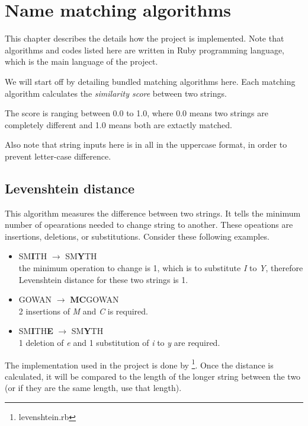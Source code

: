 \chapter{Name matching algorithms}
\label{ch:nma}

This chapter describes the details how the project is implemented.
Note that algorithms and codes listed here are written in Ruby programming language,
which is the main language of the project.

We will start off by detailing bundled matching algorithms here.
Each matching algorithm calculates the \emph{similarity score} between
two strings.

The score is ranging between 0.0 to 1.0, where 0.0 means
two strings are completely different and 1.0 means both are extactly matched.

Also note that string inputs here is in all in the uppercase format,
in order to prevent letter-case difference.

\section{Levenshtein distance}
\label{sec:leven}

This algorithm measures the difference between two strings.
It tells the minimum number of opearations needed to change string to
another. These opeations are insertions, deletions, or substitutions.
Consider these following examples.

\begin{itemize}
  \item SM\textbf{I}TH $\rightarrow$ SM\textbf{Y}TH \\
    the minimum operation to change is 1, which is to substitute \emph{I} to
    \emph{Y}, therefore Levenshtein distance for these two strings is 1.
  \item GOWAN $\rightarrow$ \textbf{MC}GOWAN \\
    2 insertions of \emph{M} and \emph{C} is required.
  \item SM\textbf{I}TH\textbf{E} $\rightarrow$ SM\textbf{Y}TH \\
    1 deletion of \emph{e} and 1 substitution of \emph{i} to \emph{y} are required.
\end{itemize}

The implementation used in the project is done by \citet{textgem}\footnote{levenshtein.rb}.
Once the distance is calculated, it will be compared to the length of
the longer string between the two (or if they are the same length,
use that length).

